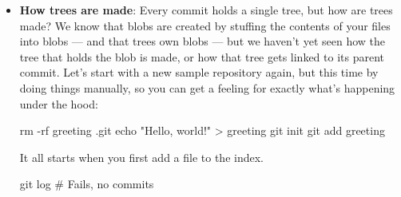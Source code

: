 \documentclass{report}
\begin{document}
\begin{itemize}
\begin{bashcode}
                diff --git a/greeting b/greeting
                new file mode 100644
                index 0000000..af5626b
                --- /dev/null
                +++ b/greeting
                @@ -0,0 +1 @@
                +Hello, world!

                git show 0563f77
                tree 0563f77

                greeting

                git show af5626b
                Hello, world!
            \end{bashcode}
        \item \textbf{How trees are made}: Every commit holds a single tree, but how are trees made? We know that blobs are created by stuffing the contents of your files into blobs — and that trees own blobs — but we haven’t yet seen how the tree that holds the blob is made, or how that tree gets linked to its parent commit.
            \bigbreak \noindent 
            Let’s start with a new sample repository again, but this time by doing things manually, so you can get a feeling for exactly what’s happening under the hood:
            \bigbreak \noindent 
            \begin{bashcode}
                rm -rf greeting .git
                echo "Hello, world!" > greeting
                git init
                git add greeting
            \end{bashcode}
            \bigbreak \noindent 
            It all starts when you first add a file to the index.
            \bigbreak \noindent 
            \begin{bashcode}
                git log # Fails, no commits


\end{bashcode}
\end{itemize}
\end{document}
